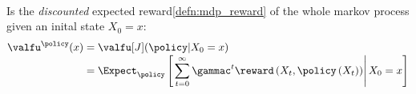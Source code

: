 \begin{defnbox}\nospacing
  \begin{defn}\label{defn:mdp_value_function}\leavevmode\\
    Is the \textit{discounted} expected reward\cref{defn:mdp_reward} of the whole markov process given an inital state $X_{0}=x$:
    \begin{align}
      \valfu^{\policy}(x)&=\valfu[J](\policy|X_{0}=x)\\[-1\jot]
      &=\Expect_{\policy}\left[\left.\sum_{t=0}^{\infty}\gammac^{t}\reward \left(X_{t},\policy\left(X_{t}\right)\right)\right|X_{0}=x\right]\\[-1\jot]
    \end{align}
  \end{defn}
\end{defnbox}
